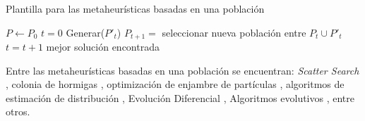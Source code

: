 \begin{algorithm}
\caption{Plantilla para las metaheurísticas basadas en una población}
\label{pmeta}
\begin{algorithmic}[1]

\State $P \gets P_0$ 
\State $t=0$
\Repeat
	\State Generar($P'_t$) 
	\State $P_{t+1}=$ seleccionar nueva población entre $P_t \cup P'_t$
	\State $t=t+1$
\State \Return mejor solución encontrada

\end{algorithmic}
\end{algorithm}

Entre las metaheurísticas basadas en una población se encuentran: \emph{Scatter Search} \cite{talbi2009metaheuristics,glover1977heuristics}, colonia de hormigas \cite{talbi2009metaheuristics,dorigo1992optimization}, optimización de enjambre de partículas \cite{talbi2009metaheuristics,eberhart2001swarm}, algoritmos de estimación de distribución \cite{talbi2009metaheuristics,lozano2006towards}, Evolución Diferencial \cite{talbi2009metaheuristics,price2006differential}, Algoritmos evolutivos \cite{talbi2009metaheuristics}, entre otros.



